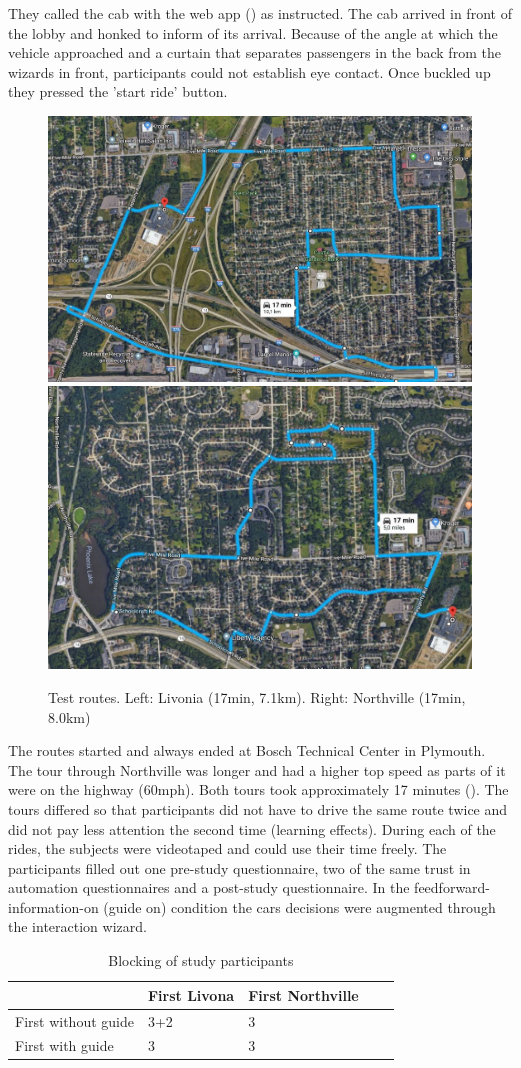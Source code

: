 They called the cab with the web app () as instructed. The cab arrived in front of the lobby and honked to inform of its arrival. Because of the angle at which the vehicle approached and a curtain that separates passengers in the back from the wizards in front, participants could not establish eye contact. Once buckled up they pressed the 'start ride' button. 
\begin{figure}
     \includegraphics[height=0.31\textwidth]{fig/RouteA_Mittel.JPG}\hfill\includegraphics[height=0.31\textwidth]{fig/RouteB_Mittel.JPG}
    \caption[Test routes]{Test routes. Left: Livonia (17min, 7.1km). Right: Northville (17min, 8.0km)}
    \label{fig:routes}
\end{figure}
The routes started and always ended at Bosch Technical Center in Plymouth. The tour through Northville was longer and had a higher top speed as parts of it were on the highway (60mph). Both tours took approximately 17 minutes (). The tours differed so that participants did not have to drive the same route twice and did not pay less attention the second time (learning effects). 
During each of the rides, the subjects were videotaped and could use their time freely. The participants filled out one pre-study questionnaire, two of the same trust in automation questionnaires \cite{Jian2010,Koo2015} and a post-study questionnaire. In the feedforward-information-on (guide on) condition the cars decisions were augmented through the interaction wizard.

\begin{table}[]
  \caption{Blocking of study participants}
  \label{tab:blocking}

\begin{tabular}{@{}l|llll@{}}
\toprule
                    & First Livona & First Northville &  &  \\ \midrule
First without guide & 3+2          & 3                &  &  \\
First with guide    & 3            & 3                &  & 
\end{tabular}
\end{table}

